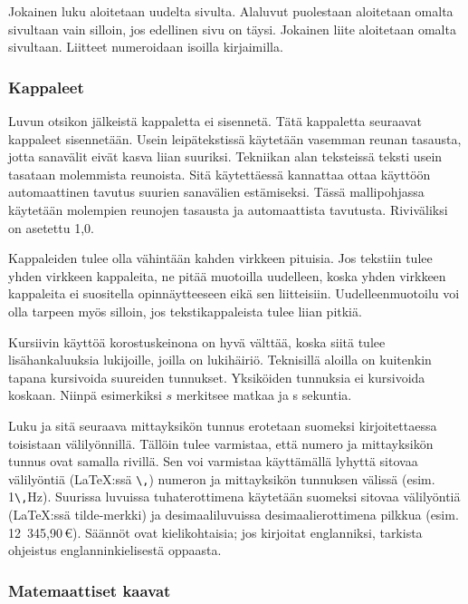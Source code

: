 \documentclass[finnish, 12pt, a4paper, elec, utf8, a-2b, online]{aaltothesis}
\begin{document}
Jokainen luku aloitetaan uudelta sivulta. Alaluvut puolestaan aloitetaan omalta 
sivultaan vain silloin, jos edellinen sivu on täysi. Jokainen liite aloitetaan 
omalta sivultaan. Liitteet numeroidaan isoilla kirjaimilla.

\subsubsection{Kappaleet}

Luvun otsikon jälkeistä kappaletta ei sisennetä. Tätä kappaletta seuraavat 
kappaleet sisennetään. Usein leipätekstissä käytetään vasemman reunan tasausta, 
jotta sanavälit eivät kasva liian suuriksi. Tekniikan alan teksteissä teksti 
usein tasataan molemmista reunoista. Sitä käytettäessä kannattaa ottaa käyttöön 
automaattinen tavutus suurien sanavälien estämiseksi. Tässä mallipohjassa 
käytetään molempien reunojen tasausta ja automaattista tavutusta. Riviväliksi 
on asetettu 1,0.

Kappaleiden tulee olla vähintään kahden virkkeen pituisia. Jos tekstiin tulee 
yhden virkkeen kappaleita, ne pitää muotoilla uudelleen, koska yhden virkkeen 
kappaleita ei suositella opinnäytteeseen eikä sen liitteisiin. 
Uudelleenmuotoilu voi olla tarpeen myös silloin, jos tekstikappaleista tulee 
liian pitkiä.

Kursiivin käyttöä korostuskeinona on hyvä välttää, koska siitä tulee 
lisähankaluuksia lukijoille, joilla on lukihäiriö. Teknisillä aloilla on 
kuitenkin tapana kursivoida suureiden tunnukset. Yksiköiden tunnuksia ei 
kursivoida koskaan. Niinpä esimerkiksi $s$ merkitsee matkaa ja s sekuntia.

Luku ja sitä seuraava mittayksikön tunnus erotetaan suomeksi kirjoitettaessa 
toisistaan välilyönnillä. Tällöin tulee varmistaa, että numero ja mittayksikön 
tunnus ovat samalla rivillä. Sen voi varmistaa käyttämällä lyhyttä sitovaa 
välilyöntiä (\LaTeX{}:ssä \verb+\,+) numeron ja mittayksikön tunnuksen välissä 
(esim. 1\verb+\,+Hz). Suurissa luvuissa tuhaterottimena käytetään suomeksi 
sitovaa välilyöntiä (\LaTeX{}:ssä tilde-merkki) ja desimaaliluvuissa 
desimaalierottimena pilkkua (esim. 12~345,90\,€). Säännöt ovat kielikohtaisia; 
jos kirjoitat englanniksi, tarkista ohjeistus englanninkielisestä oppaasta.

\subsubsection{Matemaattiset kaavat}
\end{document}
